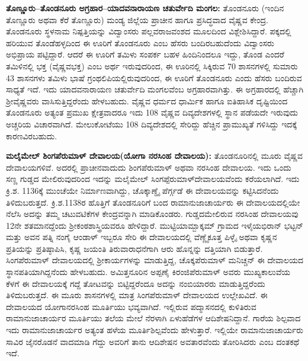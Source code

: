\textbf{ತೊಣ್ಣೂರು–ತೊಂಡನೂರು ಅಗ್ರಹಾರ–ಯಾದವನಾರಾಯಣ ಚತುರ್ವೇದಿ ಮಂಗಲ: } ತೊಂಡನೂರು (ಇಂದಿನ ತೊಣ್ಣೂರು ಅಥವಾ ಕೆರೆ ತೊಣ್ಣೂರು) ಮಂಡ್ಯ ಜಿಲ್ಲೆಯ ಪ್ರಾಚೀನ ಹಾಗೂ ಪ್ರಸಿದ್ಧವಾದ ವೈಷ್ಣವ ಕೇಂದ್ರ. ತೊಂಡನೂರು ಸ್ಥಳನಾಮ ನಿಷ್ಪತ್ತಿಯನ್ನು ವಿದ್ವಾಂಸರು ಪಲ್ಲವರಾಜವಂಶದ ಮೂಲದಿಂದ ವಿಶ್ಲೇಶಿಸಿದ್ದಾರೆ. ಪಕ್ಕದಲ್ಲಿ ಹರಿಯುವ ತೊಂಡೆಹಳ್ಳದಿಂದ ಈ ಊರಿಗೆ ತೊಂಡನೂರು ಎಂಬ ಹೆಸರು ಬಂದಿರಬಹುದೆಂದು ವಿದ್ವಾಂಸರು ಅಭಿಪ್ರಾಯ ಪಟ್ಟಿದ್ದಾರೆ. ಆದರೆ ಈ ಊರಿಗೆ ತಮಿಳು ಸಂಪರ್ಕ ಬಹಳ ಹಿಂದಿನಿಂದಲೂ ಇದ್ದು, ತೊಂಡ ಎಂದರೆ ತಮಿಳಿನಲ್ಲಿ ಭಕ್ತ (ವೈಷ್ಣವಭಕ್ತ) ಎಂಬ ಅರ್ಥ ಇರುವುದರಿಂದ, ಈ ಊರಿನಲ್ಲಿ ಸಿಕ್ಕಿರುವ 70 ಶಾಸನಗಳಲ್ಲಿ ಸುಮಾರು 43 ಶಾಸನಗಳು ತಮಿಳು ಭಾಷೆ ಗ್ರಂಥಲಿಪಿಯಲ್ಲಿರುವುದರಿಂದ, ಈ ಊರಿಗೆ ತೊಂಡನೂರು ಎಂದು ಹೆಸರು ಬಂದಿರುವ ಸಾಧ್ಯತೆ ಇದೆ. ಇದು ಯಾದವನಾರಾಯಣ ಚತುರ್ವೇದಿ ಮಂಗಲವೆಂಬ ಅಗ್ರಹಾರವಾಗಿತ್ತು. ಈ ಅಗ್ರಹಾರದಲ್ಲಿ ಹೆಚ್ಚಾಗಿ ಶ‍್ರೀವೈಷ್ಣವರು ವಾಸಿಸುತ್ತಿದ್ದರೆಂದು ಹೇಳಬಹುದು. ವೈಷ್ಣವ ಧರ್ಮದ ಧಾರ್ಮಿಕ ಹಾಗೂ ಐತಿಹಾಸಿಕ ದೃಷ್ಟಿಯಿಂದ ತೊಂಡನೂರು ಅತ್ಯಂತ ಪ್ರಮುಖ ಕ್ಷೇತ್ರವಾದರೂ ಇದು 108 ವೈಷ್ಣವ ದಿವ್ಯದೇಶಗಳಲ್ಲಿ ಸ್ಥಾನ ಪಡೆಯದೇ ಇರುವುದು ಅಚ್ಚರಿಯ ವಿಚಾರವಾಗಿದೆ. ಮೇಲುಕೋಟೆಯು 108 ದಿವ್ಯದೇಶದಲ್ಲಿ ಸೇರಿದ್ದು ಹೆಚ್ಚಿನ ಪ್ರಾಮುಖ್ಯತೆ ಗಳಿಸಿದ್ದು ಇದಕ್ಕೆ ಕಾರಣವಿರಬಹುದು.

\textbf{ಮಲೈಮೇಲ್​ ಶಿಂಗಪೆರುಮಾಳ್​ ದೇವಾಲಯ(ಯೋಗಾ ನರಸಿಂಹ ದೇವಾಲಯ):} ತೊಂಡನೂರಿನಲ್ಲಿ ಮೂರು ವೈಷ್ಣವ ದೇವಾಲಯಗಳಿವೆ. ಅದರಲ್ಲಿ ಪ್ರಾಚೀನವಾದುದು ಶಿಂಗಪೆರುಮಾಳ್​ ಅಥವಾ ನರಸಿಂಹ ದೇವಾಲಯ. ಇದು ಒಂದು ಸಣ್ಣ ಗುಡ್ಡದ ಮೇಲಿರುವುದರಿಂದ ಇದನ್ನು ಮಲೈಮೇಲ್​ ಸಿಂಗಪ್ಪೆರುಮಾಳ್​ ದೇವಾಲಯವೆಂದು ಕರೆಯಲಾಗಿದೆ. ಇದು ಕ್ರಿ.ಶ. 1136ಕ್ಕೆ ಮುಂಚೆಯೇ ನಿರ್ಮಾಣವಾಗಿದ್ದು, ಚೊಕ್ಕಾಣ್ಡೈ ಪೆರ್ಗ್ಗಡೆ ಈ ದೇವಾಲಯವನ್ನು ಕಟ್ಟಿಸಿದನೆಂದು ತಿಳಿದುಬರುತ್ತದೆ. ಕ್ರಿ.ಶ.1138ರ ಹೊತ್ತಿಗೆ ತೊಂಡನೂರಿಗೆ ಬಂದ ರಾಮಾನುಜಾಚಾರ್ಯರು ಈ ದೇವಾಲಯದಲ್ಲಿಯೇ ನೆಲೆಸಿ ಅದನ್ನು ತಮ್ಮ ಚಟುವಟಿಕೆಗಳ ಕೇಂದ್ರವನ್ನಾಗಿ ಮಾಡಿಕೊಂಡರು. ಗುಡ್ಡದಮೇಲಿರುವ ನರಸಿಂಹ ದೇವಾಲಯವು 12ನೇ ಶತಮಾನದ್ದೆಂದು ಶ‍್ರೀಕಂಠಶಾಸ್ತ್ರಿಯವರೂ ಹೇಳಿದ್ದಾರೆ. ಮುಟ್ಟಿಯಾಮ್ಬಾಕ್ಕಮ್ ಗ್ರಾಮದ ಇಳೈಯಭಿರಾನ್​ ಭಟ್ಟನ್​ ಮತ್ತು ಅವನ ಪತ್ನಿ ನಂಗೈ ಆಂಡಾಳ್​ ಇಬ್ಬರೂ ಸೇರಿ ಈ ದೇವಾಲಯದಲ್ಲಿ ವೆಣ್ಣೈಕೂತ್ತ ಪಿಳ್ಳೈ ಅಥವಾ ಕೃಷ್ಣನ ಪ್ರತಿಯನ್ನು ಪ್ರತಿಷ್ಠಾಪಿಸಿ, ಕೃಷ್ಣ ಜಯಂತಿ ತಿರುವಾರಾಧನೆಗಾಗಿ ಆರು ಹೊನ್ನನ್ನು ದತ್ತಿಯಾಗಿ ಬಿಡುತ್ತಾರೆ. ಸಿಂಗಪೆರುಮಾಳ್​ ದೇವಾಲಯದಲ್ಲಿ ಶ‍್ರೀಕಾರ್ಯಗಳನ್ನು ಮಾಡುತ್ತಿದ್ದ, ಚೊಕ್ಕಪೆರುಮಾಳ್​ ಮನಿಚ್ಚನ್​ ಈ ದೇವಾಲಯದ ಸ್ಥಾನಪತಿಯಾಗಿದ್ದನೆಂದು ಹೇಳಬಹುದು. ಅಮಿತ್ತನೂರಿನ ಅಪ್ಪಣೈ ಕಿರಂಜಿಪೆರುಮಾಳ್​ ಅವರು ಮುಖ್ಯಕಾಲುವೆಯ ಕೆಳಗೆ ಈ ದೇವಾಲಯಕ್ಕೆ ಗದ್ದೆ ತೋಟವನ್ನು ಬಿಟ್ಟಿದ್ದರೆಂದೂ ಅದನ್ನು ನಂಬಿಯಾರರು ಮಾಡುತ್ತಿದ್ದರೆಂದು ತಿಳಿದುಬರುತ್ತದೆ.  ಈ ಮೂರು ಶಾಸನಗಳಲ್ಲಿ ಮಾತ್ರ ಸಿಂಗಪೆರುಮಾಳ್​ ದೇವಾಲಯದ ಉಲ್ಲೇಖವಿದೆ. ಈ ದೇವಾಲಯದ ಯೋಗಾನರಸಿಂಹ ಮೂರ್ತಿಯು ಭವ್ಯವಾಗಿದೆ. ಇಲ್ಲಿರುವ ಪದ್ಮಾಸನದಲ್ಲಿ ಕುಳಿತಿರುವ ರಾಮಾನುಜಾಚಾರ್ಯರ ಮೂರ್ತಿಯು ತಲೆಯ ಮೇಲೆ ನೆರಳಾಗಿ ಏಳುಹೆಡೆಗಳ ಆದಿಶೇಷನಿದ್ದಾನೆ. ಗಾರೆಯ ಶಿಲ್ಪವಾದ ಇದು ರಾಮಾನುಜಾಚಾರ್ಯರ ಅತ್ಯಂತ ಹಳೆಯ ಮೂರ್ತಿಶಿಲ್ಪವೆಂದು ಹೇಳುತ್ತಾರೆ. ಇಲ್ಲಿಯೇ ರಾಮಾನುಜಾಚಾರ್ಯರು ಸಾವಿರ ಜೈನರೊಡನೆ ವಾದಮಾಡಿ ಗೆದ್ದು ಅವರಿಗೆ ತಾನು ಆದಿಶೇಷನ ಅವತಾರವೆಂದು ತೋರಿಸಿದರು ಎಂಬ ದಂತಕಥೆ ಇದೆ. 

